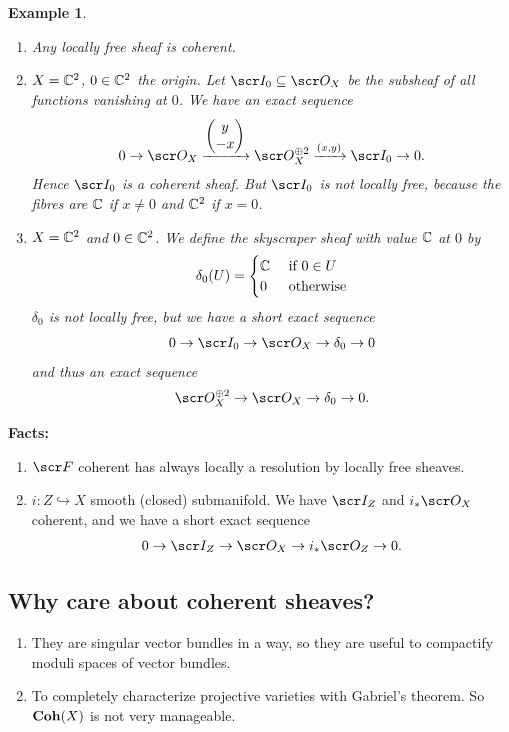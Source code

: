 \documentclass[A4paper, british, reqno]{amsart}
\theoremstyle{darkgreentheorem}
\theoremstyle{darkbluedefinition}
\theoremstyle{darkredexample}
\newtheorem{exa}[thm]{Example}
\theoremstyle{remark}
\newcommand{\1}{\mathbbm{1}}
\newcommand{\op}{\oplus}
\newcommand{\sub}{\subseteq}
\newcommand{\mono}{\hookrightarrow}
\begin{document}
\begin{exa}
    \begin{enumerate}
	\item Any locally free sheaf is coherent.
	\item $X=\mathbb{C}^{2}$, $0\in \mathbb{C}^{2}$ the origin.
	    Let $\I_{0}\sub \O_{X}$ be the subsheaf of all functions vanishing at $0$.
	    We have an exact sequence
	    \[ 0\to \O_{X}\xrightarrow{\begin{pmatrix} y \\ -x \end{pmatrix}} \O_{X}^{\op 2}\xrightarrow{(x,y)} \I_{0}\to 0.\]
	    Hence $\I_{0}$ is a coherent sheaf.
	    But $\I_{0}$ is not locally free, because the fibres are $\mathbb{C}$ if $x\neq 0$ and $\mathbb{C}^{2}$ if $x=0$.
	\item $X=\mathbb{C}^{2}$ and $0\in \mathbb{C}^{2}$.
	    We define the skyscraper sheaf with value $\mathbb{C}$ at $0$ by
	    \[ \delta_{0}(U)=
	    \begin{cases}
		\mathbb{C} &\text{ if } 0\in U \\
		0 &\text{ otherwise}
	    \end{cases}
	    \]
	    $\delta_{0}$ is not locally free, but we have a short exact sequence
	    \[ 0\to \I_{0}\to \O_{X}\to \delta_{0}\to 0 \]
	    and thus an exact sequence
	    \[ \O_{X}^{\op 2}\to \O_{X}\to \delta_{0}\to 0.\]
    \end{enumerate}
\end{exa}

\textbf{Facts:}
\begin{enumerate}
    \item $\F$ coherent has always locally a resolution by locally free sheaves.
    \item $i\colon Z\mono X$ smooth (closed) submanifold.
	We have $\I_{Z}$ and $i_{*}\O_{X}$ coherent, and we have a short exact sequence
	\[ 0\to \I_{Z}\to \O_{X}\to i_{*}\O_{Z}\to 0.\]
\end{enumerate}

\subsection{Why care about coherent sheaves?}

\begin{enumerate}
    \item They are singular vector bundles in a way, so they are useful to compactify moduli spaces of vector bundles.
    \item To completely characterize projective varieties with Gabriel's theorem.
	So $\mathbf{Coh}(X)$ is not very manageable.
\end{enumerate}
\end{document}
